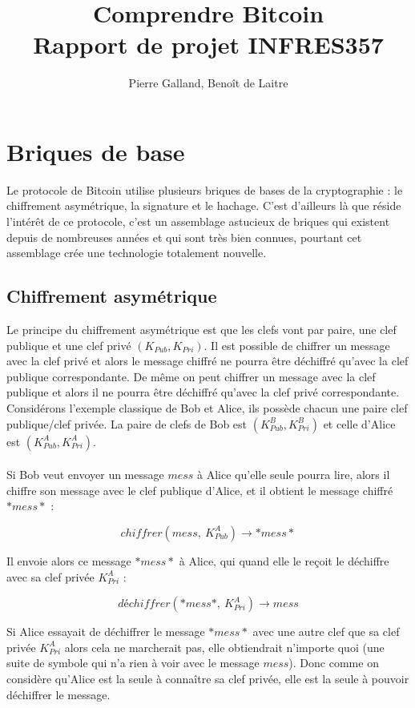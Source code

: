 \documentclass[11pt,a4paper]{article}
\title{Comprendre Bitcoin\\
Rapport de projet INFRES357
}
\author{Pierre Galland, Benoît de Laitre}
\begin{document}
\maketitle

\tableofcontents

\newpage

\section{Briques de base}

Le protocole de Bitcoin utilise plusieurs briques de bases de la cryptographie : le chiffrement asymétrique, la signature et le hachage. C'est d'ailleurs là que réside l'intérêt de ce protocole, c'est un assemblage astucieux de briques qui existent depuis de nombreuses années et qui sont très bien connues, pourtant cet assemblage crée une technologie totalement nouvelle.

\subsection{Chiffrement asymétrique}
Le principe du chiffrement asymétrique est que les clefs vont par paire, une clef publique et une clef privé $(K_{Pub}, K_{Pri})$. Il est possible de chiffrer un message avec la clef privé et alors le message chiffré ne pourra être déchiffré qu'avec la clef publique correspondante. De même on peut chiffrer un message avec la clef publique et alors il ne pourra être déchiffré qu'avec la clef privé correspondante. Considérons l'exemple classique de Bob et Alice, ils possède chacun une paire clef publique/clef privée. La paire de clefs de Bob est 
$(K_{Pub}^{B}, K_{Pri}^{B})$ et celle d'Alice est $(K_{Pub}^{A}, K_{Pri}^{A})$.\\\\

Si Bob veut envoyer un message $mess$ à Alice qu'elle seule pourra lire, alors il chiffre son message avec le clef publique d'Alice, et il obtient le message chiffré $*mess*$ :

$$chiffrer(mess, ~K_{Pub}^{A}) \rightarrow *mess*$$

Il envoie alors ce message $*mess*$ à Alice, qui quand elle le reçoit le déchiffre avec sa clef privée $K_{Pri}^{A}$ :

$$déchiffrer(*mess*, ~K_{Pri}^{A}) \rightarrow mess$$

Si Alice essayait de déchiffrer le message $*mess*$ avec une autre clef que sa clef privée $K_{Pri}^{A}$ alors cela ne marcherait pas, elle obtiendrait n'importe quoi (une suite de symbole qui n'a rien à voir avec le message $mess$). Donc comme on considère qu'Alice est la seule à connaître sa clef privée, elle est la seule à pouvoir déchiffrer le message.
\end{document}

